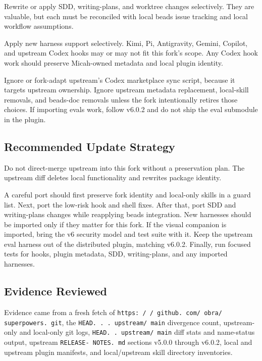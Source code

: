 \documentclass[twocolumn,10pt,letterpaper]{article}
\begin{document}
Rewrite or apply SDD, writing-plans, and worktree changes selectively. They are valuable, but each must be reconciled with local beads issue tracking and local workflow assumptions.


Apply new harness support selectively. Kimi, Pi, Antigravity, Gemini, Copilot, and upstream Codex hooks may or may not fit this fork's scope. Any Codex hook work should preserve Micah-owned metadata and local plugin identity.


Ignore or fork-adapt upstream's Codex marketplace sync script, because it targets upstream ownership. Ignore upstream metadata replacement, local-skill removals, and beads-doc removals unless the fork intentionally retires those choices. If importing evals work, follow v6.0.2 and do not ship the eval submodule in the plugin.


\subsection{Recommended Update Strategy}

Do not direct-merge upstream into this fork without a preservation plan. The upstream diff deletes local functionality and rewrites package identity.


A careful port should first preserve fork identity and local-only skills in a guard list. Next, port the low-risk hook and shell fixes. After that, port SDD and writing-plans changes while reapplying beads integration. New harnesses should be imported only if they matter for this fork. If the visual companion is imported, bring the v6 security model and test suite with it. Keep the upstream eval harness out of the distributed plugin, matching v6.0.2. Finally, run focused tests for hooks, plugin metadata, SDD, writing-plans, and any imported harnesses.


\subsection{Evidence Reviewed}

Evidence came from a fresh fetch of \texttt{https: / / github. com/ obra/ superpowers. git}, the \texttt{HEAD. . . upstream/ main} divergence count, upstream-only and local-only git logs, \texttt{HEAD. . upstream/ main} diff stats and name-status output, upstream \texttt{RELEASE- NOTES. md} sections v5.0.0 through v6.0.2, local and upstream plugin manifests, and local/upstream skill directory inventories.



\balance
\end{document}
